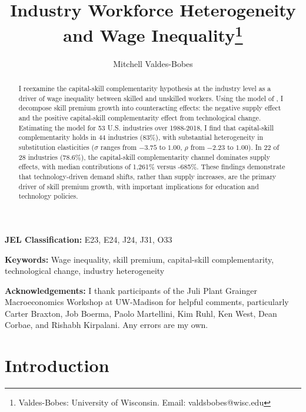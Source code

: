 \documentclass[12pt]{article}
\begin{document}
\sloppy
\title{Industry Workforce Heterogeneity and Wage Inequality\thanks{Valdes-Bobes: University of Wisconsin. Email: valdsbobes@wisc.edu}}
\author{Mitchell Valdes-Bobes}
\maketitle
\begin{abstract}
 I reexamine the capital-skill complementarity hypothesis at the industry level as a driver of wage inequality between skilled and unskilled workers. Using the model of \citet*{krusell2000capital}, I decompose skill premium growth into counteracting effects: the negative supply effect and the positive capital-skill complementarity effect from technological change. Estimating the model for 53 U.S. industries over 1988-2018, I find that capital-skill complementarity holds in 44 industries (83\%), with substantial heterogeneity in substitution elasticities ($\sigma$ ranges from $-3.75$ to $1.00$, $\rho$ from $-2.23$ to $1.00$). In 22 of 28 industries (78.6\%), the capital-skill complementarity channel dominates supply effects, with median contributions of 1,261\% versus -685\%. These findings demonstrate that technology-driven demand shifts, rather than supply increases, are the primary driver of skill premium growth, with important implications for education and technology policies.
\end{abstract}

\vspace{0.2cm}

\noindent \textbf{JEL Classification:} E23, E24, J24, J31, O33

\vspace{0.1cm}

\noindent \textbf{Keywords:} Wage inequality, skill premium, capital-skill complementarity, technological change, industry heterogeneity

\vspace{0.25cm}

\noindent \textbf{Acknowledgements:} I thank participants of the Juli Plant Grainger Macroeconomics Workshop at UW-Madison for helpful comments, particularly Carter Braxton, Job Boerma, Paolo Martellini, Kim Ruhl, Ken West, Dean Corbae, and Rishabh Kirpalani. Any errors are my own.

\thispagestyle{empty}

\pagebreak{}

\section{Introduction}\label{sec:introduction}
\end{document}
